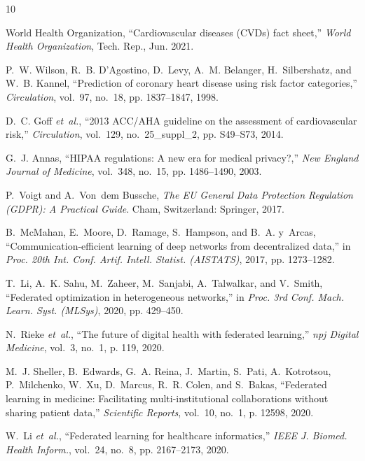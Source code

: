 \documentclass[10pt,conference]{IEEEtran}
\begin{document}

\begin{thebibliography}{10}

World Health Organization, ``Cardiovascular diseases (CVDs) fact sheet,'' \emph{World Health Organization}, Tech. Rep., Jun. 2021.

P.~W. Wilson, R.~B. D'Agostino, D.~Levy, A.~M. Belanger, H.~Silbershatz, and W.~B. Kannel, ``Prediction of coronary heart disease using risk factor categories,'' \emph{Circulation}, vol.~97, no.~18, pp. 1837--1847, 1998.

D.~C. Goff \emph{et~al.}, ``2013 ACC/AHA guideline on the assessment of cardiovascular risk,'' \emph{Circulation}, vol.~129, no.~25\_suppl\_2, pp. S49--S73, 2014.

G.~J. Annas, ``HIPAA regulations: A new era for medical privacy?,'' \emph{New England Journal of Medicine}, vol.~348, no.~15, pp. 1486--1490, 2003.

P.~Voigt and A.~Von~dem Bussche, \emph{The EU General Data Protection Regulation (GDPR): A Practical Guide}. Cham, Switzerland: Springer, 2017.

B.~McMahan, E.~Moore, D.~Ramage, S.~Hampson, and B.~A. y~Arcas, ``Communication-efficient learning of deep networks from decentralized data,'' in \emph{Proc. 20th Int. Conf. Artif. Intell. Statist. (AISTATS)}, 2017, pp. 1273--1282.

T.~Li, A.~K. Sahu, M.~Zaheer, M.~Sanjabi, A.~Talwalkar, and V.~Smith, ``Federated optimization in heterogeneous networks,'' in \emph{Proc. 3rd Conf. Mach. Learn. Syst. (MLSys)}, 2020, pp. 429--450.

N.~Rieke \emph{et~al.}, ``The future of digital health with federated learning,'' \emph{npj Digital Medicine}, vol.~3, no.~1, p. 119, 2020.

M.~J. Sheller, B.~Edwards, G.~A. Reina, J.~Martin, S.~Pati, A.~Kotrotsou, P.~Milchenko, W.~Xu, D.~Marcus, R.~R. Colen, and S.~Bakas, ``Federated learning in medicine: Facilitating multi-institutional collaborations without sharing patient data,'' \emph{Scientific Reports}, vol.~10, no.~1, p. 12598, 2020.

W.~Li \emph{et~al.}, ``Federated learning for healthcare informatics,'' \emph{IEEE J. Biomed. Health Inform.}, vol.~24, no.~8, pp. 2167--2173, 2020.


\end{thebibliography}
\end{document}
